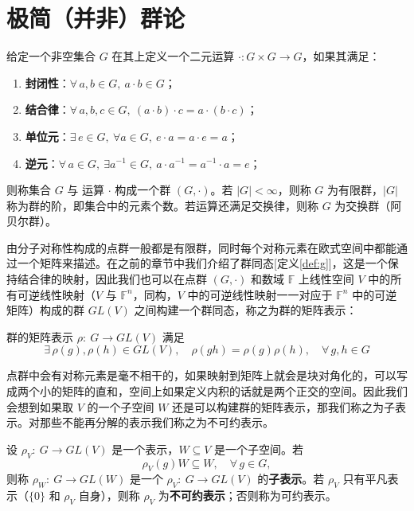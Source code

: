 \section{极简（并非）群论}
\begin{definition}[群]
给定一个非空集合 $G$ 在其上定义一个二元运算 $\cdot: G \times G \to G$，如果其满足：
\begin{enumerate}
\item \textbf{封闭性}：$\forall \, a,b \in G,\ a \cdot b \in G$；
\item \textbf{结合律}：$\forall \, a,b,c \in G,\ (a \cdot b) \cdot c = a \cdot (b \cdot c)$；
\item \textbf{单位元}：$\exists \, e \in G,\ \forall a \in G,\ e \cdot a = a \cdot e = a$；
\item \textbf{逆元}：$\forall \, a \in G,\ \exists a^{-1} \in G,\ a \cdot a^{-1} = a^{-1} \cdot a = e$；
\end{enumerate}
则称集合 $G$ 与 运算 $\cdot$ 构成一个群 $(G, \cdot)$。若 $|G| < \infty$，则称 $G$ 为有限群，$|G|$ 称为群的阶，即集合中的元素个数。若运算还满足交换律，则称 $G$ 为交换群（阿贝尔群）。
\end{definition}
由分子对称性构成的点群一般都是有限群，同时每个对称元素在欧式空间中都能通过一个矩阵来描述。在之前的章节中我们介绍了群同态[定义\ref{def:g}]，这是一个保持结合律的映射，因此我们也可以在点群 $(G, \cdot)$ 和数域 $\mathbb{F}$ 上线性空间 $V$ 中的所有可逆线性映射（$V$ 与 $\mathbb{F}^n$，同构，$V$ 中的可逆线性映射一一对应于 $\mathbb{F}^n$ 中的可逆矩阵）构成的群 $GL(V)$ 之间构建一个群同态，称之为群的矩阵表示：
\begin{definition}[群的矩阵表示]
群的矩阵表示 $\rho: \ G \to GL(V)$ 满足 
\[\exists \, \rho(g),\rho(h) \in GL(V), \quad \rho(g h) = \rho(g)\rho(h),\quad \forall \, g,h \in G\]
\end{definition}
点群中会有对称元素是毫不相干的，如果映射到矩阵上就会是块对角化的，可以写成两个小的矩阵的直和，空间上如果定义内积的话就是两个正交的空间。因此我们会想到如果取 $V$ 的一个子空间 $W$ 还是可以构建群的矩阵表示，那我们称之为子表示。对那些不能再分解的表示我们称之为不可约表示。
\begin{definition}[子表示与不可约表示]
设 $\rho_V: \ G \to GL(V)$ 是一个表示，$W \subseteq V$ 是一个子空间。若
\[\rho_V(g) W \subseteq W, \quad \forall \, g \in G,\]
则称 $\rho_W: \ G \to GL(W)$ 是一个 $\rho_V: \ G \to GL(V)$ 的\textbf{子表示}。若 $\rho_V$ 只有平凡表示（$\{0\}$ 和 $\rho_V$ 自身），则称 $\rho_V$ 为\textbf{不可约表示}；否则称为可约表示。
\end{definition}
